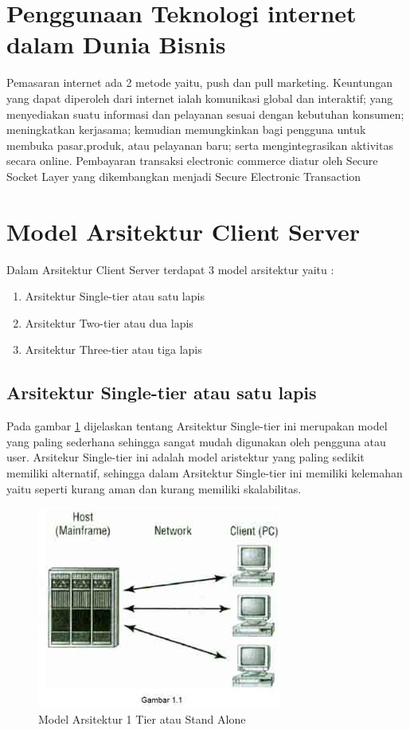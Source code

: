 \section {Penggunaan Teknologi internet dalam Dunia Bisnis}
Pemasaran internet ada 2 metode yaitu, push dan pull marketing. Keuntungan yang dapat diperoleh dari internet ialah komunikasi 
global dan interaktif; yang menyediakan suatu informasi dan pelayanan sesuai dengan kebutuhan konsumen; meningkatkan kerjasama; 
kemudian memungkinkan bagi pengguna untuk membuka pasar,produk, atau pelayanan baru; serta mengintegrasikan aktivitas secara online. 
Pembayaran transaksi electronic commerce diatur oleh Secure Socket Layer yang dikembangkan menjadi Secure Electronic Transaction

\section{Model Arsitektur Client Server}
Dalam Arsitektur Client Server terdapat 3 model arsitektur yaitu :

\begin{enumerate}
	\item Arsitektur Single-tier atau satu lapis
	\item Arsitektur Two-tier atau dua lapis
	\item Arsitektur Three-tier atau tiga lapis
\end{enumerate}

\subsection{Arsitektur Single-tier atau satu lapis}
Pada gambar \ref{1Stand} dijelaskan tentang Arsitektur Single-tier ini merupakan model yang paling sederhana sehingga sangat mudah digunakan oleh pengguna atau user.
Arsitekur Single-tier ini adalah model aristektur yang paling sedikit memiliki alternatif, sehingga dalam Arsitektur Single-tier ini
memiliki kelemahan yaitu seperti kurang aman dan kurang memiliki skalabilitas.

\begin{figure}[ht]
    \centerline{\includegraphics{figures/2modelstandalone.JPG}}
    \caption{Model Arsitektur 1 Tier atau Stand Alone}
    \label{1Stand}
\end{figure}

